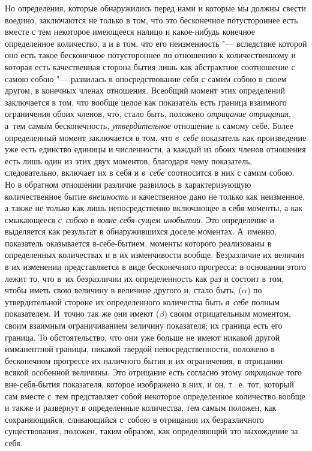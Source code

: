 Но определения, которые обнаружились перед нами и которые мы должны свести
воедино, заключаются не только в том, что это бесконечное потустороннее есть
вместе с тем некоторое имеющееся налицо и какое-нибудь конечное определенное
количество, а и в том, что его неизменность "--- вследствие которой оно есть
такое бесконечное потустороннее по отношению к количественному и которая есть
качественная сторона бытия лишь как абстрактное соотношение с самою собою "---
развилась в опосредствование себя с самим собою в своем другом, в конечных
членах отношения. Всеобщий момент этих определений заключается в том, что
вообще целое как показатель есть граница взаимного ограничения обоих членов,
что, стало быть, положено {\em отрицание отрицания}, а~тем самым бесконечность,
{\em утвердительное} отношение к самому себе. Более определенный момент
заключается в том, что {\em в~себе} показатель как произведение уже есть
единство единицы и численности, а каждый из обоих членов отношения есть лишь
один из этих двух моментов, благодаря чему показатель, следовательно, включает
их в себя и {\em в~себе} соотносится в них с самим собою. Но в обратном
отношении различие развилось в характеризующую количественное бытие
{\em внешность} и качественное дано не только как неизменное, а также не только
как лишь непосредственно включающее в себя моменты, а как смыкающееся
{\em с~собою} в {\em вовне-себя-сущем инобытии}. Это определение и выделяется
как результат в обнаружившихся доселе моментах. А~именно, показатель
оказывается в-себе-бытием, моменты которого реализованы в определенных
количествах и в их изменчивости вообще. Безразличие их величин в их изменении
представляется в виде бесконечного прогресса; в основании этого лежит то, что
в~их безразличии их определенность как раз и состоит в том, чтобы иметь свою
величину в величине другого и, стало быть, ($\alpha$) по утвердительной стороне
их определенного количества быть {\em в~себе} полным показателем. И~точно так
же они имеют ($\beta$) своим отрицательным моментом, своим взаимным
ограничиванием величину показателя; их граница есть его граница. То
обстоятельство, что они уже больше не имеют никакой другой имманентной границы,
никакой твердой непосредственности, положено в бесконечном
прогрессе их наличного бытия и их ограничения, в отрицании всякой особенной
величины. Это отрицание есть согласно этому {\em отрицание} того вне-себя-бытия
показателя, которое изображено в них, и он, т.~е. тот, который сам вместе с~тем
представляет собой некоторое определенное количество вообще и также и развернут
в определенные количества, тем самым положен, как сохраняющийся, сливающийся
с~собою в отрицании их безразличного существования, положен, таким образом, как
определяющий это выхождение за себя.


